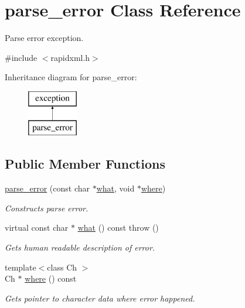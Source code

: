 \hypertarget{classrapidxml_1_1parse__error}{}\section{parse\+\_\+error Class Reference}
\label{classrapidxml_1_1parse__error}


Parse error exception.  




{\ttfamily \#include $<$rapidxml.\+h$>$}

Inheritance diagram for parse\+\_\+error\+:\begin{figure}[H]
\begin{center}
\leavevmode
\includegraphics[height=2.000000cm]{classrapidxml_1_1parse__error}
\end{center}
\end{figure}
\subsection*{Public Member Functions}
\begin{DoxyCompactItemize}
\item 
\mbox{\hyperlink{classrapidxml_1_1parse__error_a4dd8d1bdbd9221df4dcb90cafaee3332}{parse\+\_\+error}} (const char $\ast$\mbox{\hyperlink{classrapidxml_1_1parse__error_ad62489809e3df568e973597b928d6d9b}{what}}, void $\ast$\mbox{\hyperlink{classrapidxml_1_1parse__error_ad34b0f81cc71453b5b111e4afb557e1d}{where}})
\begin{DoxyCompactList}\small\item\em Constructs parse error. \end{DoxyCompactList}\item 
virtual const char $\ast$ \mbox{\hyperlink{classrapidxml_1_1parse__error_ad62489809e3df568e973597b928d6d9b}{what}} () const  throw ()
\begin{DoxyCompactList}\small\item\em Gets human readable description of error. \end{DoxyCompactList}\item 
{\footnotesize template$<$class Ch $>$ }\\Ch $\ast$ \mbox{\hyperlink{classrapidxml_1_1parse__error_ad34b0f81cc71453b5b111e4afb557e1d}{where}} () const
\begin{DoxyCompactList}\small\item\em Gets pointer to character data where error happened. \end{DoxyCompactList}\end{DoxyCompactItemize}


